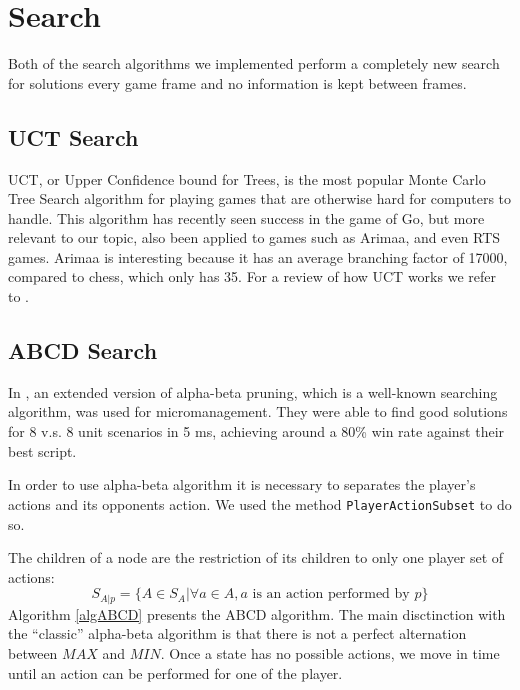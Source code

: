 \section{Search}
Both of the search algorithms we implemented perform a completely new search for solutions every game frame and no information is kept between frames.

\subsection{UCT Search}
UCT, or Upper Confidence bound for Trees, is the most popular Monte Carlo Tree Search algorithm for playing games that are otherwise hard for computers to handle. \cite{mcts}
This algorithm has recently seen success in the game of Go, but more relevant to our topic, also been applied to games such as Arimaa, and even RTS games.
Arimaa is interesting because it has an average branching factor of 17000, compared to chess, which only has 35. \cite{arimaawiki}
For a review of how UCT works we refer to \cite{mcts}.

\subsection{ABCD Search}
In \cite{abcd}, an extended version of alpha-beta pruning, which is a well-known searching algorithm, was used for micromanagement. 
They were able to find good solutions for 8 v.s. 8 unit scenarios in 5 ms, achieving around a 80\% win rate against their best script.

In order to use alpha-beta algorithm it is necessary to separates the player's actions and its opponents action. We used the method \texttt{PlayerActionSubset} to do so. 

The children of a node are the restriction of its children to only one player set of actions:
$$
S_{A|p} = \{A \in S_A | \forall a \in A, a \text{ is an action performed by $p$}\}
$$
Algorithm \ref{algABCD} presents the ABCD algorithm.
The main disctinction with the ``classic'' alpha-beta algorithm is that there is not a perfect alternation between $MAX$ and $MIN$. Once a state has no possible actions, we move in time until an action can be performed for one of the player. 

